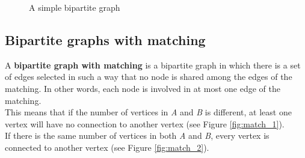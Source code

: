 \begin{figure}[H]
    \centering
    \caption{A simple bipartite graph}
    \label{fig:bipartite}
\end{figure}



\subsection{Bipartite graphs with matching}
A \textbf{bipartite graph with matching} is a bipartite graph in which there is a set of edges selected in such a way that no node is shared among the edges of the matching.
In other words, each node is involved in at most one edge of the matching. \\
This means that if the number of vertices in \textit{A} and \textit{B} is different, at least one vertex will have no connection to another vertex (see Figure \ref{fig:match_1}). \\
If there is the same number of vertices in both \textit{A} and \textit{B}, every vertex is connected to another vertex (see Figure \ref{fig:match_2}). \\


